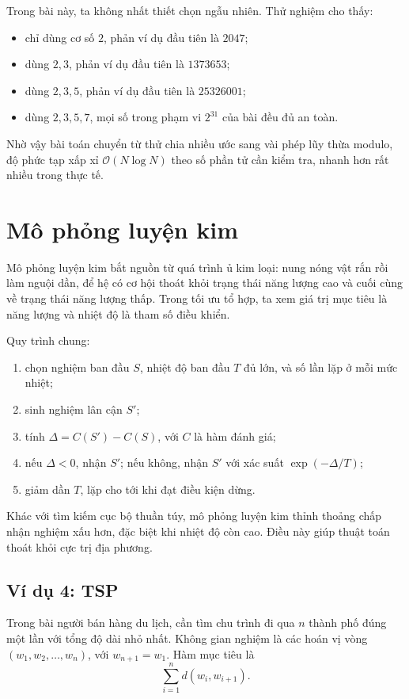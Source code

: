 \documentclass[11pt]{article}
\newcommand{\Oh}{\mathcal{O}}
\begin{document}
Trong bài này, ta không nhất thiết chọn ngẫu nhiên. Thử nghiệm cho thấy:
\begin{itemize}
  \item chỉ dùng cơ số \(2\), phản ví dụ đầu tiên là \(2047\);
  \item dùng \(2,3\), phản ví dụ đầu tiên là \(1373653\);
  \item dùng \(2,3,5\), phản ví dụ đầu tiên là \(25326001\);
  \item dùng \(2,3,5,7\), mọi số trong phạm vi \(2^{31}\) của bài đều đủ an
  toàn.
\end{itemize}

Nhờ vậy bài toán chuyển từ thử chia nhiều ước sang vài phép lũy thừa modulo,
độ phức tạp xấp xỉ \(\Oh(N\log N)\) theo số phần tử cần kiểm tra, nhanh hơn
rất nhiều trong thực tế.

\section{Mô phỏng luyện kim}

Mô phỏng luyện kim bắt nguồn từ quá trình ủ kim loại: nung nóng vật rắn rồi
làm nguội dần, để hệ có cơ hội thoát khỏi trạng thái năng lượng cao và cuối
cùng về trạng thái năng lượng thấp. Trong tối ưu tổ hợp, ta xem giá trị mục
tiêu là năng lượng và nhiệt độ là tham số điều khiển.

Quy trình chung:
\begin{enumerate}
  \item chọn nghiệm ban đầu \(S\), nhiệt độ ban đầu \(T\) đủ lớn, và số lần
  lặp ở mỗi mức nhiệt;
  \item sinh nghiệm lân cận \(S'\);
  \item tính \(\Delta=C(S')-C(S)\), với \(C\) là hàm đánh giá;
  \item nếu \(\Delta<0\), nhận \(S'\); nếu không, nhận \(S'\) với xác suất
  \(\exp(-\Delta/T)\);
  \item giảm dần \(T\), lặp cho tới khi đạt điều kiện dừng.
\end{enumerate}

Khác với tìm kiếm cục bộ thuần túy, mô phỏng luyện kim thỉnh thoảng chấp nhận
nghiệm xấu hơn, đặc biệt khi nhiệt độ còn cao. Điều này giúp thuật toán thoát
khỏi cực trị địa phương.

\subsection{Ví dụ 4: TSP}

Trong bài người bán hàng du lịch, cần tìm chu trình đi qua \(n\) thành phố
đúng một lần với tổng độ dài nhỏ nhất. Không gian nghiệm là các hoán vị vòng
\((w_1,w_2,\ldots,w_n)\), với \(w_{n+1}=w_1\). Hàm mục tiêu là
\[
  \sum_{i=1}^{n} d(w_i,w_{i+1}).
\]
\end{document}
